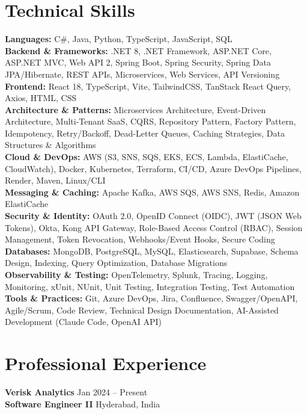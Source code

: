 \documentclass[a4paper,10pt]{article}
\begin{document}
\section*{Technical Skills}
\begin{sloppypar}
\noindent
\textbf{Languages:} C\#, Java, Python, TypeScript, JavaScript, SQL \\
\textbf{Backend \& Frameworks:} .NET 8, .NET Framework, ASP.NET Core, ASP.NET MVC, Web API 2, Spring Boot, Spring Security, Spring Data JPA/Hibernate, REST APIs, Microservices, Web Services, API Versioning \\
\textbf{Frontend:} React 18, TypeScript, Vite, TailwindCSS, TanStack React Query, Axios, HTML, CSS \\
\textbf{Architecture \& Patterns:} Microservices Architecture, Event-Driven Architecture, Multi-Tenant SaaS, CQRS, Repository Pattern, Factory Pattern, Idempotency, Retry/Backoff, Dead-Letter Queues, Caching Strategies, Data Structures \& Algorithms \\
\textbf{Cloud \& DevOps:} AWS (S3, SNS, SQS, EKS, ECS, Lambda, ElastiCache, CloudWatch), Docker, Kubernetes, Terraform, CI/CD, Azure DevOps Pipelines, Render, Maven, Linux/CLI \\
\textbf{Messaging \& Caching:} Apache Kafka, AWS SQS, AWS SNS, Redis, Amazon ElastiCache \\
\textbf{Security \& Identity:} OAuth 2.0, OpenID Connect (OIDC), JWT (JSON Web Tokens), Okta, Kong API Gateway, Role-Based Access Control (RBAC), Session Management, Token Revocation, Webhooks/Event Hooks, Secure Coding \\
\textbf{Databases:} MongoDB, PostgreSQL, MySQL, Elasticsearch, Supabase, Schema Design, Indexing, Query Optimization, Database Migrations \\
\textbf{Observability \& Testing:} OpenTelemetry, Splunk, Tracing, Logging, Monitoring, xUnit, NUnit, Unit Testing, Integration Testing, Test Automation \\
\textbf{Tools \& Practices:} Git, Azure DevOps, Jira, Confluence, Swagger/OpenAPI, Agile/Scrum, Code Review, Technical Design Documentation, AI-Assisted Development (Claude Code, OpenAI API)
\end{sloppypar}

\section*{Professional Experience}

\textbf{Verisk Analytics} \hfill Jan 2024 -- Present \\
\textbf{Software Engineer II} \hfill Hyderabad, India
\end{document}

